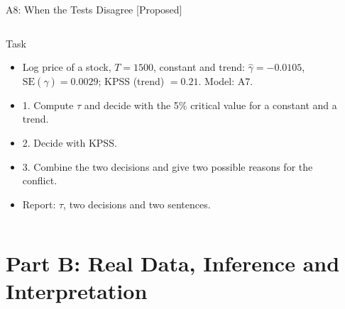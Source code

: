 \begin{frame}{A8: When the Tests Disagree [Proposed]}
\propsub
\itemsize{\scriptsize}
\begin{columns}[T]
\begin{column}{\taskw}
\begin{block}{Task}
\begin{itemize}
    \item Log price of a stock, $T = 1500$, constant and trend: $\hat\gamma = -0.0105$, $\mathrm{SE}(\hat\gamma) = 0.0029$; KPSS (trend) $= 0.21$. Model: A7.
    \item 1. Compute $\tau$ and decide with the 5\% critical value for a constant and a trend.
    \item 2. Decide with KPSS.
    \item 3. Combine the two decisions and give two possible reasons for the conflict.
    \item Report: $\tau$, two decisions and two sentences.
\end{itemize}
\end{block}
\end{column}
\begin{column}{\solw}
\end{column}
\end{columns}
\end{frame}


\section{Part B: Real Data, Inference and Interpretation}

